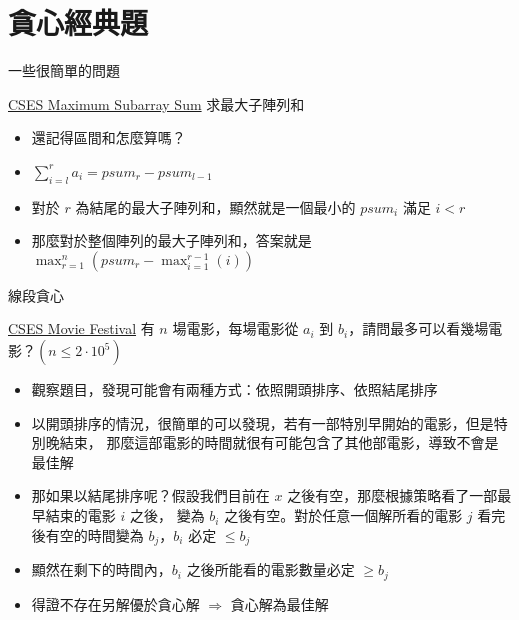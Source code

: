 \documentclass[aspectratio=169]{beamer}
\begin{document}
    \section{貪心經典題}

    \begin{frame}{一些很簡單的問題}
        \begin{block}{\href{https://cses.fi/problemset/task/1643}{CSES Maximum Subarray Sum}}
            求最大子陣列和
        \end{block}

        \begin{itemize}
            \item<1-> 還記得區間和怎麼算嗎？
            \item<2-> $\displaystyle\sum_{i = l}^{r}{a_i} = psum_{r} - psum_{l - 1}$ 
            \item<3-> 對於 $r$ 為結尾的最大子陣列和，顯然就是一個最小的 $psum_{i}$ 滿足 $i < r$
            \item<4-> 那麼對於整個陣列的最大子陣列和，答案就是 
            $\displaystyle\max_{r = 1}^{n}(psum_{r} - \max_{i = 1}^{r - 1}(i))$
        \end{itemize}
    \end{frame}

    \begin{frame}{線段貪心}
        \begin{block}{\href{https://cses.fi/problemset/task/1629}{CSES Movie Festival}}
            有 $n$ 場電影，每場電影從 $a_i$ 到 $b_i$，請問最多可以看幾場電影？$(n \le 2 \cdot 10^5)$
        \end{block}

        \begin{itemize}
            \item<1-> 觀察題目，發現可能會有兩種方式：依照開頭排序、依照結尾排序
            \item<2-> 以開頭排序的情況，很簡單的可以發現，若有一部特別早開始的電影，但是特別晚結束，
            那麼這部電影的時間就很有可能包含了其他部電影，導致不會是最佳解
            \item<3-> 那如果以結尾排序呢？假設我們目前在 $x$ 之後有空，那麼根據策略看了一部最早結束的電影 $i$ 之後，
            變為 $b_i$ 之後有空。對於任意一個解所看的電影 $j$ 看完後有空的時間變為 $b_j$，$b_i$ 必定 $\le b_j$
            \item<4-> 顯然在剩下的時間內，$b_i$ 之後所能看的電影數量必定 $\ge b_j$
            \item<5-> 得證不存在另解優於貪心解 $\Rightarrow$ 貪心解為最佳解
        \end{itemize}
    \end{frame}
\end{document}
